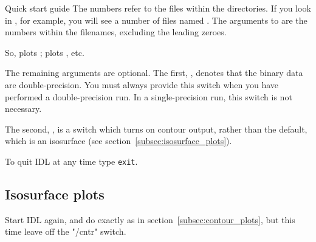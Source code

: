 \begin{chapter}{\label{cha:quickstart} Quick start guide}
  The numbers refer to the files within the  directories.  If you
  look in , for example, you will see a number of files named
  .  The arguments to  are the numbers
  within the filenames, excluding the leading zeroes.

  So,  plots ;  plots , etc.

  The remaining arguments are optional.  The first, , denotes that
  the binary data are double-precision.  You must always provide this switch
  when you have performed a double-precision run.  In a single-precision run,
  this switch is not necessary.

  The second, , is a switch which turns on contour output, rather
  than the default, which is an isosurface (see
  section~\ref{subsec:isosurface_plots}).

  To quit IDL at any time type \verb"exit".

  \subsection{\label{subsec:isosurface_plots}Isosurface plots}
  Start IDL again, and do exactly as in section~\ref{subsec:contour_plots}, but
  this time leave off the \gpevar"/cntr" switch.
  

\end{chapter}
